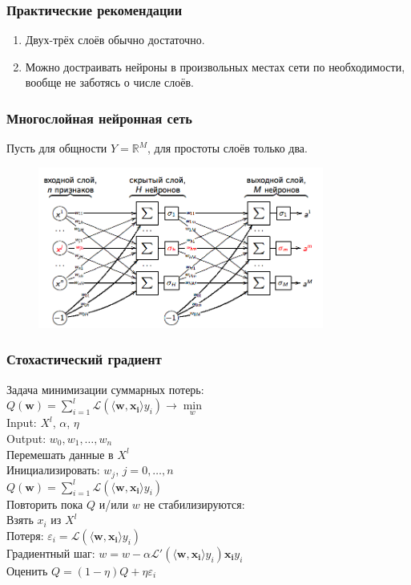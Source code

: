 \documentclass[12pt]{beamer}
\begin{document}
\begin{frame}\frametitle{Практические рекомендации}
\begin{enumerate}[--]
\item Двух-трёх слоёв обычно достаточно.
\item Можно достраивать нейроны в произвольных местах сети по необходимости, вообще не заботясь о числе слоёв.
\end{enumerate}
\end{frame}

\begin{frame}\frametitle{Многослойная нейронная сеть}
Пусть для общности $Y = \mathbb{R}^M$, для простоты слоёв только два.\\

\begin{figure}[htbp]
  \includegraphics[height=150pt, keepaspectratio = true]{images/neural_network}   
\end{figure}
\end{frame}

\begin{frame}\frametitle{Стохастический градиент}
Задача минимизации суммарных потерь:\\
${Q}(\mathbf{w}) = \sum\limits_{i=1}^l \mathcal{L}(\langle \mathbf{w}, \mathbf{x_i} \rangle y_i) \rightarrow \min\limits_w$ \\
Input: $X^l$, $\alpha$, $\eta$\\
Output: $w_0, w_1, \dots, w_n$\\
\vspace{3mm}
Перемешать данные в $X^l$\\
Инициализировать: $w_j$, $j=0,\dots, n$\\
\hspace{35mm} ${Q}(\mathbf{w}) = \sum\limits_{i=1}^l \mathcal{L}(\langle \mathbf{w}, \mathbf{x_i} \rangle y_i)$\\
Повторить пока $Q$ и/или $w$ не стабилизируются:\\
\hspace{5mm} Взять $x_i$ из $X^l$\\
\hspace{5mm} Потеря: $\varepsilon_i = \mathcal{L}(\langle \mathbf{w}, \mathbf{x_i} \rangle y_i)$\\
\hspace{5mm} Градиентный шаг: $w =  w - \alpha \mathcal{L}'(\langle \mathbf{w}, \mathbf{x_i}\rangle y_i)\mathbf{x_i}y_i$\\
\hspace{5mm} Оценить $Q = (1-\eta)Q + \eta \varepsilon_i$
\end{frame}
\end{document}
